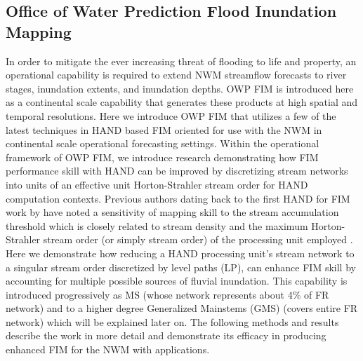 \documentclass[draft]{dependencies/agujournal2019}
\begin{document}
\subsection{Office of Water Prediction Flood Inundation Mapping}
%
In order to mitigate the ever increasing threat of flooding to life and property, an operational capability is required to extend NWM streamflow forecasts to river stages, inundation extents, and inundation depths.
OWP FIM is introduced here as a continental scale capability that generates these products at high spatial and temporal resolutions.
Here we introduce OWP FIM that utilizes a few of the latest techniques in HAND based FIM oriented for use with the NWM in continental scale operational forecasting settings. 
Within the operational framework of OWP FIM, we introduce research demonstrating how FIM performance skill with HAND can be improved by discretizing stream networks into units of an effective unit Horton-Strahler stream order \cite{horton1945erosional,strahler1952hypsometric,strahler1952hypsometric} for HAND computation contexts.
Previous authors dating back to the first HAND for FIM work by  have noted a sensitivity of mapping skill to the stream accumulation threshold which is closely related to stream density and the maximum Horton-Strahler stream order (or simply stream order) of the processing unit employed \cite{zhang2018comparative,mcgehee2016modified,li2020evaluation}.
Here we demonstrate how reducing a HAND processing unit's stream network to a singular stream order discretized by level paths (LP), can enhance FIM skill by accounting for multiple possible sources of fluvial inundation.
This capability is introduced progressively as MS (whose network represents about 4\% of FR network) and to a higher degree Generalized Mainstems (GMS) (covers entire FR network) which will be explained later on.
The following methods and results describe the work in more detail and demonstrate its efficacy in producing enhanced FIM for the NWM with applications.
%
\clearpage %

\end{document}
